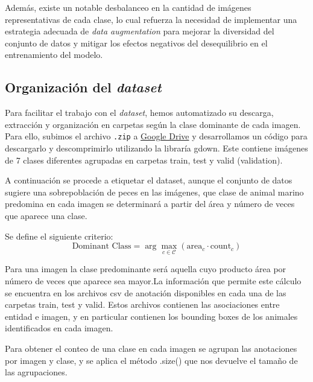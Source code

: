 \quad

\noindent
Además, existe un notable desbalanceo en la cantidad de imágenes representativas de cada clase, lo cual refuerza la necesidad de implementar una estrategia adecuada de 
\textit{data augmentation} para mejorar la diversidad del conjunto de datos y mitigar los efectos negativos del desequilibrio en el entrenamiento del modelo.

\subsection{Organización del \textit{dataset}}

\noindent
Para facilitar el trabajo con el \textit{dataset}, hemos automatizado su descarga, extracción y organización en carpetas según la clase dominante de
cada imagen. Para ello, subimos el archivo \texttt{.zip} a \href{https://drive.google.com/uc?id=1iGBv-VT5mm1RiouD-U2qWcU3BYqp2OwE}{Google Drive} y 
desarrollamos un código para descargarlo y descomprimirlo utilizando la libraría gdown. Este contiene imágenes de 7 clases diferentes agrupadas en carpetas train, test y valid (validation).  

\quad  

\noindent
A continuación se procede a etiquetar el dataset, aunque el conjunto de datos sugiere una sobrepoblación de peces en las imágenes, que clase de animal marino predomina en cada imagen se determinará a partir del área y número de veces que aparece una clase.

\noindent
Se define el siguiente criterio:
\begin{equation}
    \text{Dominant Class} = \arg\max_{c \in \mathcal{C}} \left( \text{area}_c \cdot \text{count}_c \right)
\end{equation}


\noindent
Para una imagen la clase predominante será aquella cuyo producto área por número de veces que aparece sea mayor.La información que permite este cálculo se encuentra en los archivos csv de anotación disponibles en cada una de las carpetas train, test y valid. 
Estos archivos contienen las asociaciones entre entidad e imagen, y en particular contienen los bounding boxes de los animales identificados en cada imagen. 

\quad  

\noindent
Para obtener el conteo de una clase en cada imagen se agrupan las anotaciones por imagen y clase, y se aplica el método .size() que nos devuelve el tamaño de las agrupaciones.

